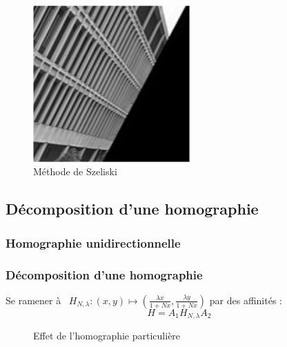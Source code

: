 \documentclass[c,12pt]{beamer}
\newcommand{\subfig}[1]{\subfigure{\texttt{[image: \#1]}}}
\newcommand{\arrow}{{\raisebox{15\height}{\scalebox{1}{$\longrightarrow$}}}}
\begin{document}
\begin{frame}
\begin{figure}
\centering
\includegraphics[width=6cm]{zoom_shear_pas_aliase.png}
\caption{Méthode de Szeliski}
\end{figure}
\end{frame}


 \subsection{Décomposition d'une homographie}

  \subsubsection{Homographie unidirectionnelle}

  \begin{frame} %
  \frametitle{Décomposition d'une homographie}
   Se ramener à  $H_{N,\lambda} : (x,y) \mapsto \left(\frac{\lambda x}{1+Nx},\frac{\lambda y}{1+Nx}\right)$ par des affinités :
   \[H = A_1 H_{N,\lambda} A_2\]
   \begin{figure}
    \centering
  \subfig{balloon}
    \arrow
    \subfig{Image_homo_particuliere_opt}
    \caption{Effet de l'homographie particulière}
   \end{figure}
  \end{frame}
  

  
\end{document}
